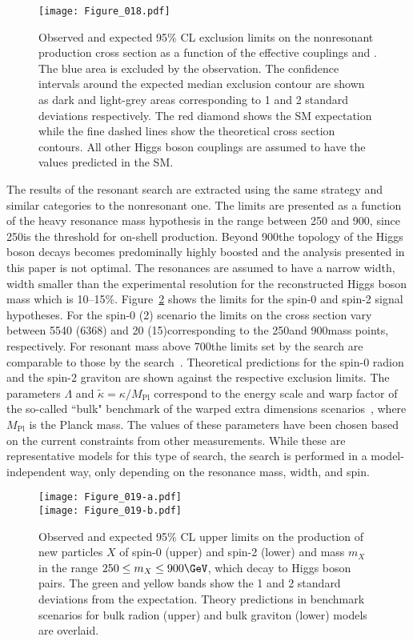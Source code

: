 \begin{figure}[htb!]
  \centering
  \texttt{[image: Figure\_018.pdf]}
  \caption{Observed and expected 95\% CL exclusion limits on the nonresonant \HH production cross section as a function of the effective couplings \klambda and \ctwo. The blue area is excluded by the observation. The confidence intervals around the expected median exclusion contour are shown as dark and light-grey areas corresponding to 1 and 2 standard deviations respectively. The red diamond shows the SM expectation while the fine dashed lines show the theoretical cross section contours. All other Higgs boson couplings are assumed to have the values predicted in the SM.}
  \label{fig:c2_limits_2D}
\end{figure}



The results of the resonant search are extracted using the same strategy and similar categories to the nonresonant one.
The limits are presented as a function of the heavy resonance mass hypothesis in the range between 250 and 900\GeV, since 250\GeV is the threshold for on-shell \HH production. Beyond 900\GeV the topology of the Higgs boson decays becomes predominally highly boosted and the analysis presented in this paper is not optimal. The resonances are assumed to have a narrow width, \ie width smaller than the experimental resolution for the reconstructed Higgs boson mass which is 10--15\%. Figure~\ref{fig:resonant_limits} shows the limits for the spin-0 and spin-2 signal hypotheses. For the spin-0 (2) scenario the limits on the cross section vary between 5540 (6368) and 20 (15)\fb corresponding to the 250\GeV and 900\GeV mass points, respectively. For resonant mass above 700\GeV the limits set by the \bbWW search are comparable to those by the \bbgg search~\cite{CMS_HHbbgg_R2Resonant}.
Theoretical predictions for the spin-0 radion and the spin-2 graviton are shown against the respective exclusion limits. The parameters $\Lambda$ and $\tilde{\kappa} = \kappa/M_{\text{Pl}}$ correspond to the energy scale and warp factor of the so-called ``bulk" benchmark of the warped extra dimensions scenarios~\cite{Carvalho:2014lsg,Gouzevitch:1536639}, where $M_{\text{Pl}}$ is the Planck mass. The values of these parameters have been chosen based on the current constraints from other measurements.
While these are representative models for this type of search, the search is performed in a model-independent way, only depending on the resonance mass, width, and spin.
\begin{figure}[htb!]
  \centering
  \texttt{[image: Figure\_019-a.pdf]}\\
  \texttt{[image: Figure\_019-b.pdf]}
  \caption{Observed and expected 95\% CL upper limits on the production of new particles $X$ of spin-0 (upper) and spin-2 (lower) and mass $m_X$ in the range $250 \leq m_X \leq 900\GeV$, which
    decay to Higgs boson pairs. The green and yellow bands show the 1 and 2 standard deviations from the expectation. Theory predictions in benchmark scenarios for bulk radion (upper) and bulk graviton (lower) models are overlaid.}
  \label{fig:resonant_limits}
\end{figure}


